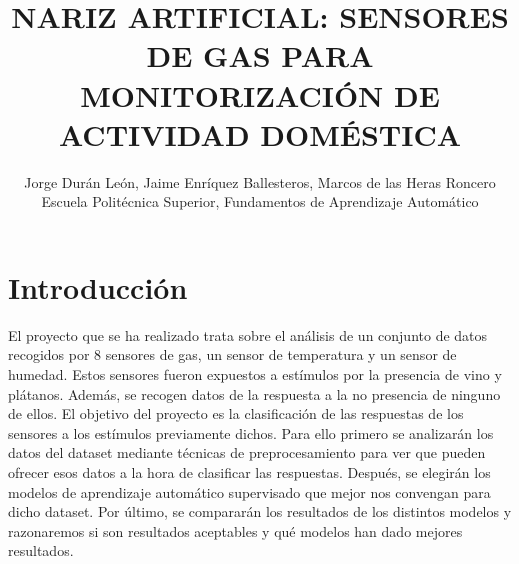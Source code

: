 \documentclass{esannV2}
\begin{document}
\title{NARIZ ARTIFICIAL: SENSORES DE GAS PARA MONITORIZACIÓN DE ACTIVIDAD DOMÉSTICA}

\author{Jorge Durán León, Jaime Enríquez Ballesteros, Marcos de las Heras Roncero
%
%
\vspace{.3cm}\\
%
  Escuela Politécnica Superior, Fundamentos de Aprendizaje Automático \\
%
}

\maketitle


\section{Introducción}

El proyecto que se ha realizado trata sobre el análisis de un conjunto de datos recogidos por 8 sensores de gas, un sensor de temperatura y un sensor de humedad. Estos sensores fueron expuestos a estímulos por la presencia de vino y plátanos. Además, se recogen datos de la respuesta a la no presencia de ninguno de ellos. El objetivo del proyecto es la clasificación de las respuestas de los sensores a los estímulos previamente dichos. Para ello primero se analizarán los datos del dataset mediante técnicas de preprocesamiento para ver que pueden ofrecer esos datos a la hora de clasificar las respuestas. Después, se elegirán los modelos de aprendizaje automático supervisado que mejor nos convengan para dicho dataset. Por último, se compararán los resultados de los distintos modelos y razonaremos si son resultados aceptables y qué modelos han dado mejores resultados.
\end{document}
